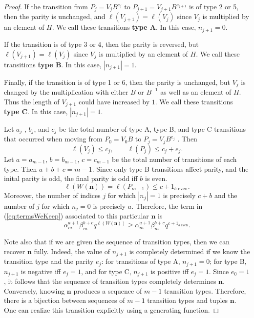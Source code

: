 \documentclass[10pt,a4paper]{amsart}
\begin{document}
\begin{proof}
If the transition from $P_{j}=V_{j}B^{e_{j}}$ to $P_{j+1}=V_{j+1}B^{e_{j+1}}$
is of type 2 or 5, then the parity is unchanged, and $\ell(V_{j+1})=\ell(V_{j})$
since $V_{j}$ is multiplied by an element of $H$. We call these
transitions \textbf{type A}. In this case, $n_{j+1}=0$.

If the transition is of type 3 or 4, then the parity is reversed,
but $\ell(V_{j+1})=\ell(V_{j})$ since $V_{j}$ is multiplied by an
element of $H$. We call these transitions \textbf{type B}. In this
case, $|n_{j+1}|=1$.

Finally, if the transition is of type 1 or 6, then the parity is unchanged,
but $V_{j}$ is changed by the multiplication with either $B$ or
$B^{-1}$ as well as an element of $H$. Thus the length of $V_{j+1}$
could have increased by $1$. We call these transitions \textbf{type
C}. In this case, $|n_{j+1}|=1$.

Let $a_{j}$ , $b_{j}$, and $c_{j}$ be the total number of type
A, type B, and type C transitions that occurred when moving from $P_{0}=V_{0}B$
to $P_{j}=V_{j}B^{e_{j}}$ . Then
\[
\ell(V_{j})\leq c_{j},\qquad\ell(P_{j})\leq c_{j}+e_{j}.
\]
Let $a=a_{m-1}$, $b=b_{m-1}$, $c=c_{m-1}$ be the total number of
transitions of each type. Then $a+b+c=m-1$. Since only type B transitions
affect parity, and the inital parity is odd, the final parity is odd
iff $b$ is even. 
\[
\ell(W(\mathbf{n}))=\ell(P_{m-1})\leq c+1_{b\textrm{ even}}.
\]
Moreover, the number of indices $j$ for which $|n_{j}|=1$ is precisely
$c+b$ and the number of $j$ for which $n_{j}=0$ is precisely $a$.
Therefore, the term in (\ref{eq:termsWeKeep}) associated to this
particular $\mathbf{n}$ is 
\begin{equation}
\alpha_{m}^{a+1}\beta_{m}^{b+c}q^{\ell(W(\mathbf{n}))}\geq\alpha_{m}^{a+1}\beta_{m}^{b+c}q^{c+1_{b\textrm{ even}}}.\label{eq:estimateOnabTerm}
\end{equation}

Note also that if we are given the sequence of transition types, then
we can recover $\mathbf{n}$ fully. Indeed, the value of $n_{j+1}$
is completely determined if we know the transition type and the parity
$e_{j}$: for transitions of type A, $n_{j+1}=0$; for type B, $n_{j+1}$
is negative iff $e_{j}=1$, and for type C, $n_{j+1}$ is positive
iff $e_{j}=1$. Since $e_{0}=1$, it follows that the sequence of
transition types completely determines $\mathbf{n}$. Conversely,
knowing $\mathbf{n}$ produces a sequence of $m-1$ transition types.
Therefore, there is a bijection between sequences of $m-1$ transition
types and tuples $\mathbf{n}$. One can realize this transition explicitly
using a generating function.


\end{proof}
\end{document}
